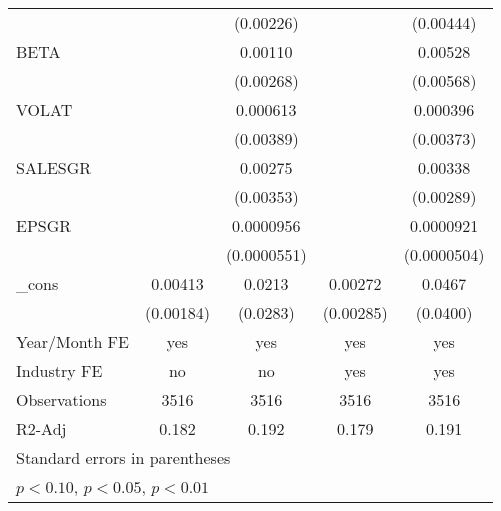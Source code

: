 \begin{table}[htbp]
\begin{tabular}{l*{4}{c}}
                &                  &(0.00226)         &                  &(0.00444)         \\
BETA            &                  &  0.00110         &                  &  0.00528         \\
                &                  &(0.00268)         &                  &(0.00568)         \\
VOLAT           &                  & 0.000613         &                  & 0.000396         \\
                &                  &(0.00389)         &                  &(0.00373)         \\
SALESGR         &                  &  0.00275         &                  &  0.00338         \\
                &                  &(0.00353)         &                  &(0.00289)         \\
EPSGR           &                  &0.0000956\sym{*}  &                  &0.0000921\sym{*}  \\
                &                  &(0.0000551)         &                  &(0.0000504)         \\
\_cons          &  0.00413\sym{**} &   0.0213         &  0.00272         &   0.0467         \\
                &(0.00184)         & (0.0283)         &(0.00285)         & (0.0400)         \\
\hline
Year/Month FE   &      yes         &      yes         &      yes         &      yes         \\
Industry FE     &       no         &       no         &      yes         &      yes         \\
Observations    &     3516         &     3516         &     3516         &     3516         \\
R2-Adj          &    0.182         &    0.192         &    0.179         &    0.191         \\
\hline\hline
\multicolumn{5}{l}{\footnotesize Standard errors in parentheses}\\
\multicolumn{5}{l}{\footnotesize \sym{*} \(p<0.10\), \sym{**} \(p<0.05\), \sym{***} \(p<0.01\)}\\
\end{tabular}
\end{table}
